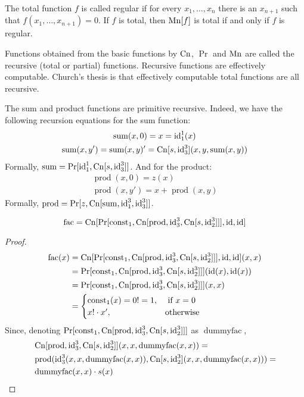 The total function $f$ is called regular if for every $x_1,\ldots,x_n$ there is an $x_{n+1}$ such that $f(x_1,\ldots,x_{n+1}) = 0$.
If $f$ is total, then $\operatorname{Mn}[f]$ is total if and only if $f$ is regular.

Functions obtained from the basic functions by $\operatorname{Cn}$, $\Pr$ and $\operatorname{Mn}$ are called the recursive (total or partial) functions.
Recursive functions are effectively computable.
Church's thesis is that effectively computable total functions are all recursive.

\begin{example}
  \newcommand{\rsum}{\operatorname{sum}}
  \newcommand{\rprod}{\operatorname{prod}}
  The sum and product functions are primitive recursive.
  Indeed, we have the following recursion equations for the sum function:
  \begin{gather*}
    \rsum(x,0)=x=\id_1^1(x)\\
    \rsum(x,y')=\rsum(x,y)'=\Cn[s, \id_3^3](x, y, \rsum(x,y))
  \end{gather*}
  Formally, $\rsum=\Pr[\id_1^1,\Cn[s, \id_3^3]]$. And for the product:
  \begin{gather*}
    \rprod(x,0)=z(x)\\
    \rprod(x,y')=x+\rprod(x,y)
  \end{gather*}
  Formally, $\rprod=\Pr[z,\Cn[\rsum,\id_1^3,\id_3^3]]$.
\end{example}

\begin{exercise}
  \begin{equation*}
    \operatorname{fac} = \operatorname{Cn}[\Pr[\operatorname{const}_1, \operatorname{Cn}[\operatorname{prod}, \operatorname{id}_3^3, \operatorname{Cn}[s, \operatorname{id}_2^3]]], \operatorname{id}, \operatorname{id}]
  \end{equation*}
\end{exercise}
\begin{proof}
  \begin{align*}
    \operatorname{fac}(x) &= \operatorname{Cn}[\Pr[\operatorname{const}_1, \operatorname{Cn}[\operatorname{prod}, \operatorname{id}_3^3, \operatorname{Cn}[s, \operatorname{id}_2^3]]], \operatorname{id}, \operatorname{id}](x, x) \\
    &= \Pr[\operatorname{const}_1, \operatorname{Cn}[\operatorname{prod}, \operatorname{id}_3^3, \operatorname{Cn}[s, \operatorname{id}_2^3]]](\operatorname{id}(x), \operatorname{id}(x)) \\
    &= \Pr[\operatorname{const}_1, \operatorname{Cn}[\operatorname{prod}, \operatorname{id}_3^3, \operatorname{Cn}[s, \operatorname{id}_2^3]]](x, x) \\
    &= \begin{cases}
      \operatorname{const}_1(x) = 0! = 1, &\text{ if }x=0\\
      x!\cdot x', &\text{otherwise}
    \end{cases}
  \end{align*}
  Since, denoting $\Pr[\operatorname{const}_1, \operatorname{Cn}[\operatorname{prod}, \operatorname{id}_3^3, \operatorname{Cn}[s, \operatorname{id}_2^3]]]$ as $\operatorname{dummyfac}$,
  \begin{align*}
    &\operatorname{Cn}[\operatorname{prod}, \operatorname{id}_3^3, \operatorname{Cn}[s, \operatorname{id}_2^3]](x, x, \operatorname{dummyfac}(x,x)) =\\
    &\operatorname{prod}(\operatorname{id}_3^3(x,x,\operatorname{dummyfac}(x,x)), \operatorname{Cn}[s, \operatorname{id}_2^3](x,x,\operatorname{dummyfac}(x,x))) =\\
    &\operatorname{dummyfac}(x,x) \cdot s(x)
  \end{align*}
\end{proof}

